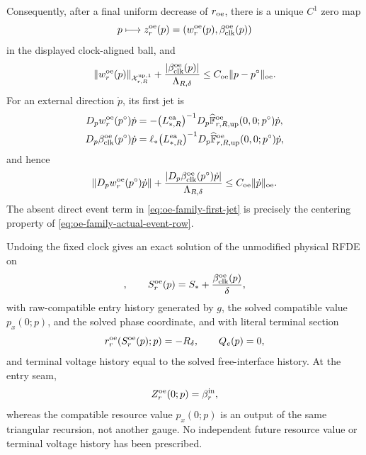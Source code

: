 \begin{theorem}
Consequently, after a final uniform decrease of \(r_{\rm oe}\), there is a
unique \(C^1\) zero map
\begin{equation}
 p\longmapsto z^{\rm oe}_r(p)
   =(w^{\rm oe}_r(p),\beta_{\rm clk}^{\rm oe}(p))
                                                        \label{eq:oe-family-zero-map}
\end{equation}
in the displayed clock-aligned ball, and
\begin{equation}
 \|w^{\rm oe}_r(p)\|_{\mathcal X_{r,R}^{\rm up,1}}
 +\frac{|\beta_{\rm clk}^{\rm oe}(p)|}{\Lambda_{R,\delta}}
 \le C_{\rm oe}\|p-p^\circ\|_{\rm oe}.          \label{eq:oe-family-zero-bound}
\end{equation}
For an external direction \(\dot p\), its first jet is
\begin{align}
 D_pw_r^{\rm oe}(p^\circ)\dot p
 &=-\bigl(L_{*,R}^{\rm ea}\bigr)^{-1}
       D_p\widehat{\mathbb F}^{\rm oe}_{r,R,{\rm up}}
          (0,0;p^\circ)\dot p,\notag\\
 D_p\beta_{\rm clk}^{\rm oe}(p^\circ)\dot p
 &=\ell_*\bigl(L_{*,R}^{\rm ea}\bigr)^{-1}
       D_p\widehat{\mathbb F}^{\rm oe}_{r,R,{\rm up}}
          (0,0;p^\circ)\dot p,                 \label{eq:oe-family-first-jet}
\end{align}
and hence
\begin{equation}
 \|D_pw_r^{\rm oe}(p^\circ)\dot p\|
 +\frac{|D_p\beta_{\rm clk}^{\rm oe}(p^\circ)\dot p|}
       {\Lambda_{R,\delta}}
 \le C_{\rm oe}\|\dot p\|_{\rm oe}.             \label{eq:oe-family-first-jet-bound}
\end{equation}
The absent direct event term in
\cref{eq:oe-family-first-jet} is precisely the centering property of
\cref{eq:oe-family-actual-event-row}.

Undoing the fixed clock gives an exact solution of the unmodified physical
RFDE on
\begin{equation}
 [-\theta_m,S_r^{\rm oe}(p)],\qquad
 S_r^{\rm oe}(p)=S_*+
       \frac{\beta_{\rm clk}^{\rm oe}(p)}{\delta},         \label{eq:oe-family-physical-duration}
\end{equation}
with raw-compatible entry history generated by \(g\), the solved
compatible value \(p_x(0;p)\), and the solved phase coordinate, and with
literal terminal section
\begin{equation}
 r_r^{\rm oe}(S_r^{\rm oe}(p);p)=-R_\delta,\qquad
 Q_e(p)=0,                                      \label{eq:oe-family-physical-endpoint-identities}
\end{equation}
and terminal voltage history equal to the solved free-interface history.
At the entry seam,
\begin{equation}
 Z_r^{\rm oe}(0;p)=\beta_r^{\rm in},             \label{eq:oe-family-entry-gauge-identity}
\end{equation}
whereas the compatible resource value \(p_x(0;p)\) is an output of the
same triangular recursion, not another gauge.  No independent future
resource value or terminal voltage history has been prescribed.


\end{theorem}
